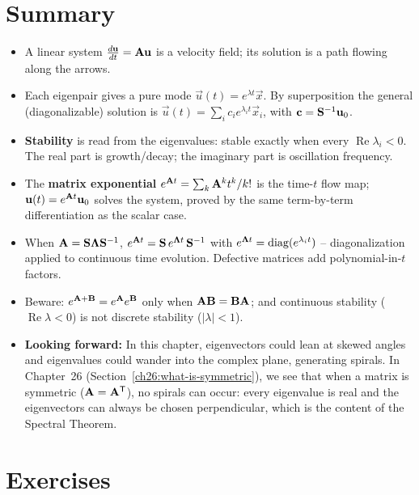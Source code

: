 \section*{Summary}

\begin{itemize}
  \item A linear system $\frac{d\mathbf{u}}{dt}=\mathbf{A}\mathbf{u}$ is a velocity field;
        its solution is a path flowing along the arrows.
  \item Each eigenpair gives a pure mode $\vec{u}(t)=e^{\lambda t}\vec{x}$. By
        superposition the general (diagonalizable) solution is
        $\vec{u}(t)=\sum_i c_i e^{\lambda_i t}\vec{x}_i$, with $\mathbf{c}=
        \mathbf{S}^{-1}\mathbf{u}_0$.
  \item \textbf{Stability} is read from the eigenvalues: stable exactly when every
        $\operatorname{Re}\lambda_i < 0$. The real part is growth/decay; the
        imaginary part is oscillation frequency.
  \item The \textbf{matrix exponential} $e^{\mathbf{A}t}=\sum_k \mathbf{A}^kt^k/k!$ is
        the time-$t$ flow map; $\mathbf{u}(t)=e^{\mathbf{A}t}\mathbf{u}_0$ solves the
        system, proved by the same term-by-term differentiation as the scalar
        case.
  \item When $\mathbf{A}=\mathbf{S}\mathbf{\Lambda}\mathbf{S}^{-1}$,
        $e^{\mathbf{A}t}=\mathbf{S}\,e^{\mathbf{\Lambda}t}\,\mathbf{S}^{-1}$ with
        $e^{\mathbf{\Lambda}t}=\operatorname{diag}(e^{\lambda_i t})$ -- diagonalization applied to
        continuous time evolution. Defective matrices add polynomial-in-$t$ factors.
  \item Beware: $e^{\mathbf{A}+\mathbf{B}}=e^{\mathbf{A}}e^{\mathbf{B}}$ only when
        $\mathbf{A}\mathbf{B}=\mathbf{B}\mathbf{A}$; and continuous stability ($\operatorname{Re}
        \lambda<0$) is not discrete stability ($|\lambda|<1$).
  \item \textbf{Looking forward:} In this chapter, eigenvectors could lean at
        skewed angles and eigenvalues could wander into the complex plane,
        generating spirals. In Chapter~26 (Section~\ref{ch26:what-is-symmetric}), we see
        that when a matrix is symmetric ($\mathbf{A} = \mathbf{A}^{\mathsf{T}}$), no spirals can
        occur: every eigenvalue is real and the eigenvectors can always be
        chosen perpendicular, which is the content of the Spectral Theorem.
\end{itemize}

\section{Exercises}
\label{ch25:exercises}

